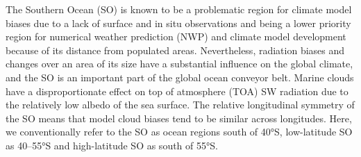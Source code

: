 \documentclass[12pt,a4paper]{article}
\begin{document}
The Southern Ocean (SO) is known to be a problematic region for climate model
biases due to a lack of surface and in situ observations and being a lower
priority region for numerical weather prediction (NWP) and climate model
development because of its distance from populated areas.  Nevertheless,
radiation biases and changes over an area of its size have a substantial
influence on the global climate, and the SO is an important part of the global
ocean conveyor belt.  Marine clouds have a disproportionate effect on top of
atmosphere (TOA) SW radiation due to the relatively low albedo of the sea
surface.  The relative longitudinal symmetry of the SO means that model cloud
biases tend to be similar across longitudes.  Here, we conventionally refer to
the SO as ocean regions south of 40°S, low-latitude SO as 40--55°S and
high-latitude SO as south of 55°S.
\end{document}
